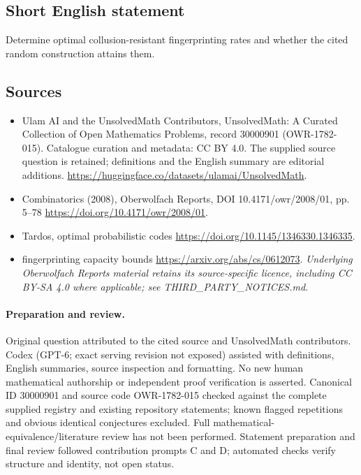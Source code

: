 \documentclass[11pt]{article}
\begin{document}
\subsection{Short English statement}
Determine optimal collusion-resistant fingerprinting rates and whether the cited random construction attains them.
\subsection{Sources}
\begin{itemize}
\item[\hypertarget{source:30000901:1}{S1}] Ulam AI and the UnsolvedMath Contributors, UnsolvedMath: A Curated Collection of Open Mathematics Problems, record 30000901 (OWR-1782-015). Catalogue curation and metadata: CC BY 4.0. The supplied source question is retained; definitions and the English summary are editorial additions.
\url{https://huggingface.co/datasets/ulamai/UnsolvedMath}.
\item[\hypertarget{source:30000901:2}{S2}] Combinatorics (2008), Oberwolfach Reports, DOI 10.4171/owr/2008/01, pp. 5--78
\url{https://doi.org/10.4171/owr/2008/01}.
\item[\hypertarget{source:30000901:3}{S3}] Tardos, optimal probabilistic codes
\url{https://doi.org/10.1145/1346330.1346335}.
\item[\hypertarget{source:30000901:4}{S4}] fingerprinting capacity bounds
\url{https://arxiv.org/abs/cs/0612073}.
\textit{Underlying Oberwolfach Reports material retains its source-specific licence, including CC BY-SA 4.0 where applicable; see THIRD\_PARTY\_NOTICES.md.}
\end{itemize}
\paragraph{Preparation and review.}
Original question attributed to the cited source and UnsolvedMath contributors. Codex (GPT-6; exact serving revision not exposed) assisted with definitions, English summaries, source inspection and formatting. No new human mathematical authorship or independent proof verification is asserted. Canonical ID 30000901 and source code OWR-1782-015 checked against the complete supplied registry and existing repository statements; known flagged repetitions and obvious identical conjectures excluded. Full mathematical-equivalence/literature review has not been performed. Statement preparation and final review followed contribution prompts C and D; automated checks verify structure and identity, not open status.
\label{end:30000901}
\end{document}
